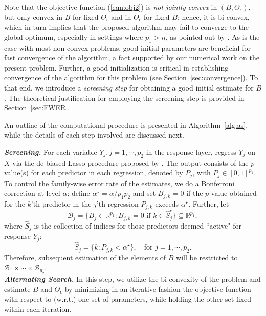 Note that the objective function (\ref{eqn:obj2}) is {\em not jointly convex} in $(B,\Theta_\epsilon)$, but only 
convex in $B$ for fixed $\Theta_\epsilon$ and in $\Theta_\epsilon$ for fixed $B$; hence, it is bi-convex, which in turn
implies that the proposed algorithm may fail to converge to the global optimum, especially in settings where $p_1>n$, as pointed out by \citet{lee2012simultaneous}. As is the case with most non-convex problems, good initial parameters are beneficial for fast 
convergence of the algorithm, a fact supported by our numerical work on the present problem.  
Further, a good initialization is critical in establishing convergence of the algorithm for this problem (see Section~\ref{sec:convergence}).
To that end, we introduce a {\em screening step} for obtaining a good initial estimate for $B$. The theoretical 
justification for employing the screening step is provided in Section~\ref{sec:FWER}.

An outline of the computational procedure is presented in Algorithm~\ref{alg:as}, while the details of each step involved are discussed next.


\textit{\textbf{Screening.}} For each variable $Y_j, j=1,\cdots,p_2$ in the response layer, regress $Y_j$ on $X$ via the de-biased Lasso procedure proposed by \citet{javanmard2014confidence}. The output consists of the $p$-value(s) for each predictor in each regression, denoted by $P_j$, with $P_j\in
[0,1]^{p_1}$. To control the family-wise error rate of the estimates, we do a Bonferroni correction at level $\alpha$: define $\alpha^{\star} = \alpha/p_1 p_2$ and set $B_{j,k} = 0$ if the
$p$-value obtained for the $k$'th predictor in the $j$'th regression $P_{j,k}$ exceeds $\alpha^{\star}$. Further, let 
\begin{equation}\label{eqn:support}
\mathcal{B}_j=\{B_j\in\mathbb{R}^{p_1}:B_{j,k}=0\text{ if }k\in \widehat{S}_j^c\} \subseteq \mathbb{R}^{p_1},
\end{equation}
where $\widehat{S}_j$ is the collection of indices for those predictors deemed ``active" for response $Y_j$:
\begin{equation*}
\widehat{S}_j = \{k:P_{j,k}<\alpha^{\star}\}, \quad \text{for }j=1,\cdots,p_2.
\end{equation*}
Therefore, subsequent estimation of the elements of $B$ will be restricted to $\mathcal{B}_1\times\cdots\times \mathcal{B}_{p_2}$. \\

\textit{\textbf{Alternating Search.}} In this step, we utilize the bi-convexity of the problem and estimate $B$ and $\Theta_\epsilon$ by minimizing in an iterative fashion the objective function with respect to (w.r.t.) one set of parameters, while holding the other set fixed within each iteration. 


